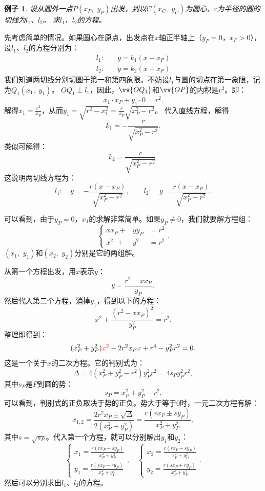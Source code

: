 \documentclass[12pt,UTF8]{ctexbook}
\newtheorem{ex}{例子}[section]
\begin{document}
\begin{ex}\label{ex:0-0-0}
    设从圆外一点$P(x_P, \,\,y_P)$出发，到以$C(x_C,\,\,y_C)$为圆心，$r$为半径的圆的切线为$l_1$、$l_2$。
    求$l_1$、$l_2$的方程。
\end{ex}

先考虑简单的情况。如果圆心在原点，出发点在$x$轴正半轴上（$y_P = 0$，$x_P>0$），设$l_1$、$l_2$的方程分别为：
\begin{align*}
    l_1:\quad & y = k_1(x - x_P)  \\
    l_2:\quad & y = k_2(x - x_P)  
\end{align*}
我们知道两切线分别切圆于第一和第四象限。不妨设$l_1$与圆的切点在第一象限，记为$Q_1(x_1,\,\,y_1)$。
$OQ_1\perp l_1$，因此，$\vv{OQ_1}$和$\vv{OP}$的内积是$r^2$。即：
$$ x_1\cdot x_P + y_1\cdot 0 = r^2.$$
解得$x_1 = \frac{r^2}{x_P}$，从而$y_1 = \sqrt{r^2 - x_1^2} = \frac{r}{x_P}\sqrt{x_P^2 - r^2}$。
代入直线方程，解得
$$k_1 = -\frac{r}{\sqrt{x_P^2 - r^2}}.$$
类似可解得：
$$k_2 = \frac{r}{\sqrt{x_P^2 - r^2}}.$$
这说明两切线方程为：
$$l_1: \quad y = -\frac{r(x - x_P)}{\sqrt{x_P^2 - r^2}}, \qquad l_2:\quad y = \frac{r(x - x_P)}{\sqrt{x_P^2 - r^2}}.$$

可以看到，由于$y_P = 0$，$x_1$的求解非常简单。如果$y_P \neq 0$，我们就要解方程组：
$$ 
  \left\{ \begin{array}{rrc}
    x x_P +& y y_P &= r^2 \\
    x^2\,\, +& y^2 &= r^2
  \end{array}\right. .
$$
$(x_1, \,\,y_1)$和$(x_2,\,\,y_2)$分别是它的两组解。

从第一个方程出发，用$x$表示$y$：
$$ y = \frac{r^2 - xx_P}{y_P},$$
然后代入第二个方程，消掉$y_1$，得到以下的方程：
$$ x^2 + \frac{(r^2 - xx_P)^2}{y_P^2} = r^2.$$
整理即得到：
$$ (x_P^2+y_P^2){\color{red}x^2} - 2r^2x_P{\color{red}x} + r^4 - y_P^2r^2 = 0.$$
这是一个关于$x$的二次方程。它的判别式为：
$$\Delta = 4(x_P^2+y_P^2 - r^2)y_P^2r^2 = 4s_Py_P^2r^2,$$
其中$s_P$是$P$到圆的势：
$$ s_P = x_P^2+y_P^2 - r^2. $$
可以看到，判别式的正负取决于势的正负。势大于等于$0$时，一元二次方程有解：
$$x_{1,2} = \frac{2r^2x_P \pm \sqrt{\Delta} }{2(x_P^2+y_P^2)} =  \frac{r(rx_P \pm sy_P) }{x_P^2+y_P^2}, $$
其中$s = \sqrt{s_P}$。代入第一个方程，就可以分别解出$y_1$和$y_2$：
$$
    \left\{ \begin{array}{rrc}
        x_1 = \frac{r(rx_P + sy_P) }{x_P^2+y_P^2} \\
        y_1 = \frac{r(sx_P - ry_P)}{x_P^2+y_P^2}
    \end{array}\right., 
    \quad
    \left\{ \begin{array}{rrc}
        x_2 = \frac{r(rx_P - sy_P) }{x_P^2+y_P^2} \\
        y_2 = \frac{r(sx_P + ry_P)}{x_P^2+y_P^2}
    \end{array}\right..
$$
然后可以分别求出$l_1$、$l_2$的方程。
\end{document}
